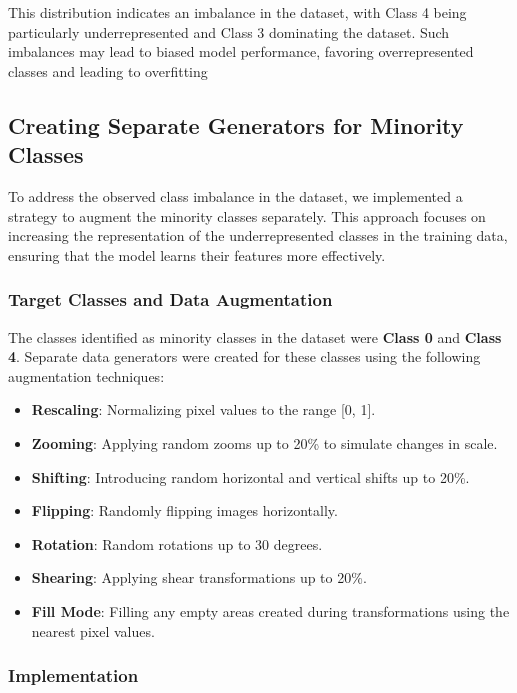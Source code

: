 \documentclass{article}
\begin{document}
\noindent
This distribution indicates an imbalance in the dataset, with Class 4 being particularly underrepresented and Class 3 dominating the dataset. Such imbalances may lead to biased model performance, favoring overrepresented classes and leading to overfitting

\subsection{Creating Separate Generators for Minority Classes}

To address the observed class imbalance in the dataset, we implemented a strategy to augment the minority classes separately. This approach focuses on increasing the representation of the underrepresented classes in the training data, ensuring that the model learns their features more effectively.

\subsubsection{Target Classes and Data Augmentation}

The classes identified as minority classes in the dataset were \textbf{Class 0} and \textbf{Class 4}. Separate data generators were created for these classes using the following augmentation techniques:
\begin{itemize}
    \item \textbf{Rescaling}: Normalizing pixel values to the range [0, 1].
    \item \textbf{Zooming}: Applying random zooms up to 20\% to simulate changes in scale.
    \item \textbf{Shifting}: Introducing random horizontal and vertical shifts up to 20\%.
    \item \textbf{Flipping}: Randomly flipping images horizontally.
    \item \textbf{Rotation}: Random rotations up to 30 degrees.
    \item \textbf{Shearing}: Applying shear transformations up to 20\%.
    \item \textbf{Fill Mode}: Filling any empty areas created during transformations using the nearest pixel values.
\end{itemize}

\subsubsection{Implementation}
\end{document}
